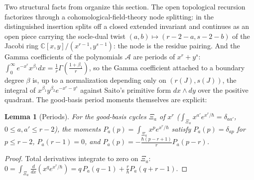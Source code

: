 \documentclass[11pt]{amsart}
\newtheorem{lemma}[theorem]{Lemma}
\theoremstyle{definition}
\theoremstyle{remark}
\newcommand{\CC}{\mathbb{C}}
\newcommand{\Ascr}{\mathcal{A}}
\begin{document}
Two structural facts from \cite{GKT} organize this section. The open
topological recursion factorizes through a
cohomological-field-theory node splitting: in
\cite[Lem.~6.4]{GKT} the distinguished insertion splits off a closed extended
invariant and continues as an open piece carrying the socle-dual twist
$(a,b)\mapsto(r{-}2{-}a,s{-}2{-}b)$ of the Jacobi ring
$\CC[x,y]/(x^{r-1},y^{s-1})$: the node is the residue pairing. And the
Gamma coefficients of the polynomials $\Ascr$ are periods of
$x^{r}+y^{s}$: $\int_{0}^{\infty}e^{-x^{r}}x^{\beta_1}dx=\tfrac1r\Gamma(\tfrac{1+\beta_1}r)$,
so the Gamma coefficient attached to a boundary degree $\beta$ is, up to a
normalization depending only on $(r(J),s(J))$, the integral of
$x^{\beta_1}y^{\beta_2}e^{-x^r-y^s}$ against Saito's primitive form
$dx\wedge dy$ over the positive quadrant.  The good-basis period moments themselves are explicit:

\begin{lemma}[Periods]
\label{lem:periods}
For the good-basis cycles $\Xi_{a}$ of $x^{r}$
($\int_{\Xi_{a}}x^{a'}e^{x^{r}/\hbar}=\delta_{aa'}$, $0\le a,a'\le r-2$), the
moments $P_{a}(p)=\int_{\Xi_{a}}x^{p}e^{x^{r}/\hbar}$ satisfy
$P_{a}(p)=\delta_{ap}$ for $p\le r{-}2$, $P_{a}(r{-}1)=0$, and
$P_{a}(p)=-\tfrac{\hbar(p-r+1)}{r}P_{a}(p-r)$.
\end{lemma}

\begin{proof}
Total derivatives integrate to zero on $\Xi_{a}$:
$0=\int_{\Xi_{a}}\tfrac{d}{dx}(x^{q}e^{x^{r}/\hbar})
=q\,P_{a}(q{-}1)+\tfrac r\hbar P_{a}(q{+}r{-}1)$.
\end{proof}
\end{document}
